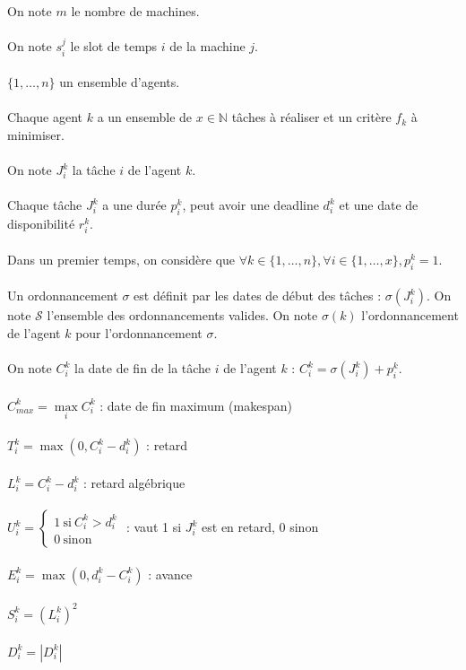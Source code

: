 \documentclass[12pt]{article}
\theoremstyle{definition}
\begin{document}
\noindent
On note $m$ le nombre de machines.\\\\
On note $s_i^j$ le slot de temps $i$ de la machine $j$.\\\\
$\lbrace 1,\dots , n \rbrace$ un ensemble d'agents.\\\\
Chaque agent $k$ a un ensemble de $x \in \mathbb{N}$ tâches à réaliser et un critère $f_k$ à minimiser.\\\\
On note $J_i^k$ la tâche $i$ de l'agent $k$.\\\\
Chaque tâche $J_i^k$ a une durée $p_i^k$, peut avoir une deadline $d_i^k$ et une date de disponibilité $r_i^k$.\\\\
Dans un premier temps, on considère que $\forall k \in \lbrace 1, \dots , n \rbrace, \forall i \in \lbrace 1, \dots , x \rbrace, p_i^k = 1$.\\\\
Un ordonnancement $\sigma$ est définit par les dates de début des tâches : $\sigma(J_i^k)$. On note $\mathscr{S}$ l'ensemble des ordonnancements valides. On note $\sigma(k)$ l'ordonnancement de l'agent $k$ pour l'ordonnancement $\sigma$.\\\\
On note $C_i^k$ la date de fin de la tâche $i$ de l'agent $k$ : $C_i^k = \sigma(J_i^k) + p_i^k$.\\\\
$C_{max}^k = \max\limits_i C_i^k$ : date de fin maximum (makespan)\\\\
$T_i^k = \max(0, C_i^k - d_i^k)$ : retard\\\\
$L_i^k = C_i^k - d_i^k$ : retard algébrique\\\\
$U_i^k = \left\{
\begin{array}{l}
  1 \ \mathrm{si} \ C_i^k>d_i^k \\
  0 \ \mathrm{sinon}
\end{array}
\right.$ : vaut 1 si $J_i^k$ est en retard, 0 sinon\\\\
$E_i^k = \max (0, d_i^k - C_i^k)$ : avance\\\\
$S_i^k = (L_i^k)^2$\\\\
$D_i^k = |D_i^k|$
\end{document}

